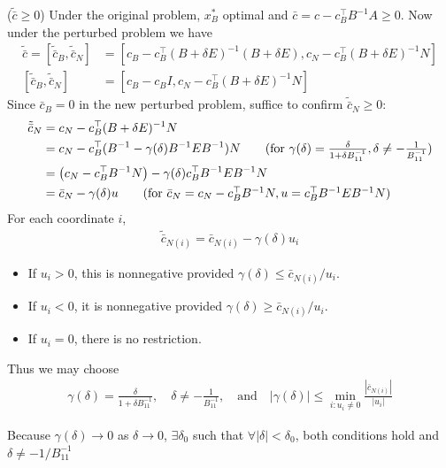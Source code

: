\documentclass[11pt]{exam}
\begin{document}
\begin{questions}
\begin{parts}
\begin{subparts}
          \subpart ($\tilde{\bar c} \geq 0$) 
          \newline Under the original problem, $x_B^*$ optimal and $\bar c = c - c_B^\top B^{-1}A \geq 0$. Now under the perturbed problem we have
          \begin{align*}
            \tilde{\bar{c}} = [\tilde{\bar{c}}_B, \tilde{\bar{c}}_N] &= \left[c_B - c_B^\top(B + \delta E)^{-1}(B + \delta E), c_N - c_B^\top(B + \delta E)^{-1}N\right]\\
            [\tilde{\bar{c}}_B, \tilde{\bar{c}}_N] &= \left[c_B - c_BI, c_N -  c_B^\top(B + \delta E)^{-1}N\right]
          \end{align*}
          Since $\bar c_B = 0$ in the new perturbed problem, suffice to confirm $\tilde{\bar{c}}_N \geq 0$:
          \begin{align*}
            \tilde{\bar{c}}_N &= c_N -  c_B^\top(B + \delta E)^{-1}N\\
            &= c_N - c_B^\top (B^{-1} - \gamma(\delta)B^{-1}EB^{-1})N \tag{for $\gamma(\delta) = \frac{\delta}{1 + \delta B^{-1}_{11}}, \delta \neq -\frac{1}{B_{11}^{-1}}$}\\
            &= \left(c_N - c_B^\top B^{-1}N\right) - \gamma(\delta)c_B^\top B^{-1}EB^{-1}N\\
            &= \bar{c}_N - \gamma(\delta)u \tag{for $\bar c_N = c_N - c_B^\top B^{-1}N, u = c_B^\top B^{-1}EB^{-1}N$}
          \end{align*}
          For each coordinate $i$,
          \begin{align*}
            \tilde{\bar c}_{N(i)} = \bar c_{N(i)} - \gamma(\delta)u_i
          \end{align*}
          \begin{itemize}
            \item If $u_i > 0$, this is nonnegative provided
            $\gamma(\delta) \le \bar c_{N(i)} / u_i$.
            \item If $u_i < 0$, it is nonnegative provided
            $\gamma(\delta) \ge \bar c_{N(i)} / u_i$.
            \item If $u_i = 0$, there is no restriction.
          \end{itemize}
          Thus we may choose
          \begin{align*}
            \gamma(\delta) = \frac{\delta}{1 + \delta B^{-1}_{11}}, 
            \quad \delta \neq -\frac{1}{B^{-1}_{11}},
            \quad\text{and}\quad 
            |\gamma(\delta)| \le \min_{i:u_i\neq0} \frac{|\bar c_{N(i)}|}{|u_i|}
          \end{align*}
        \end{subparts}
        Because $\gamma(\delta) \rightarrow 0$ as $\delta \rightarrow 0$, $\exists \delta_0$ such that $\forall |\delta| < \delta_0$, both conditions hold and $\delta \neq -1 / B_{11}^{-1}$
        

\end{parts}
\end{questions}
\end{document}
